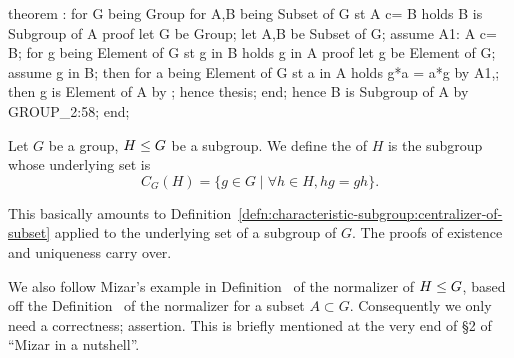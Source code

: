\nwenddocs{}\endmoddef\nwstartdeflinemarkup{}\nwenddeflinemarkup
theorem :
  for G being Group
  for A,B being Subset of G
  st A c= B
  holds  B is Subgroup of  A
proof
  let G be Group;
  let A,B be Subset of G;
  assume A1: A c= B;
  for g being Element of G st g in  B
  holds g in  A
  proof
    let g be Element of G;
    assume g in  B;
    then for a being Element of G st a in A
    holds g*a = a*g by A1,;
    then g is Element of  A by ;
    hence thesis;
  end;
  hence  B is Subgroup of  A by GROUP_2:58;
end;
\eatline
{}\nwendcode{}\nwdocspar
\begin{definition}
Let $G$ be a group, $H\leq G$ be a subgroup.
We define the  of $H$ is the subgroup whose
underlying set is
\begin{equation}
C_{G}(H) = \{g\in G\mid \forall h\in H, hg=gh\}.
\end{equation}
\end{definition}

\begin{def-remark}
This basically amounts to Definition~\ref{defn:characteristic-subgroup:centralizer-of-subset}
applied to the underlying set of a subgroup of $G$. The proofs of
existence and uniqueness carry over.
\end{def-remark}
\begin{def-remark}
We also follow Mizar's example in Definition~ of the
normalizer of $H\leq G$, based off the
Definition~ of the normalizer for a subset $A\subset G$.
Consequently we only need a {\Tt{}correctness;\nwendquote} assertion. This is briefly
mentioned at the very end of \S2 of ``Mizar in a nutshell''.
\end{def-remark}

